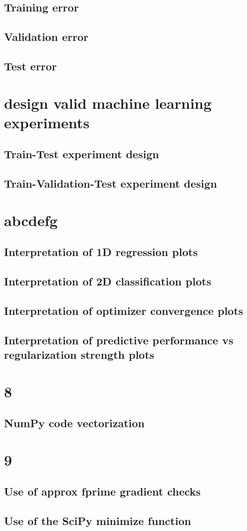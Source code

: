 \documentclass[11pt]{article}
\begin{document}
    \subsection{Training error}
    \subsection{Validation error}
    \subsection{Test error}

    \section{design valid machine learning experiments}
    \subsection{Train-Test experiment design}
    \subsection{Train-Validation-Test experiment design}
    
    \section{abcdefg}
    \subsection{Interpretation of 1D regression plots}
    \subsection{Interpretation of 2D classification plots}
    \subsection{Interpretation of optimizer convergence plots}
    \subsection{Interpretation of predictive performance vs regularization strength plots}
    \section{8}
    \subsection{NumPy code vectorization}
    
    \section{9}
    \subsection{Use of approx fprime gradient checks}
    \subsection{Use of the SciPy minimize function}
\end{document}
